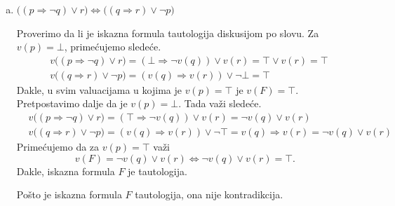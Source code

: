 \begin{enumerate}[(a)]
\item  $\big((p\Rightarrow\neg q)\vee r\big)\Leftrightarrow\big((q\Rightarrow r)\vee\neg p\big)$

Proverimo da li je iskazna formula tautologija diskusijom po slovu. Za $v(p)=\bot$, prime\' cujemo slede\' ce.
\begin{align*}
&v\big((p\Rightarrow\neg q)\vee r\big)=(\bot\Rightarrow \neg v(q))\vee v(r)=\top\vee v(r)=\top\\
&v\big((q\Rightarrow r)\vee\neg p\big)=(v(q)\Rightarrow v(r))\vee\neg\bot=\top
\end{align*}
Dakle, u svim valuacijama u kojima je $v(p)=\top$ je $v(F)=\top$. Pretpostavimo dalje da je $v(p)=\bot$. Tada va\v zi slede\' ce.
\begin{align*}
&v\big((p\Rightarrow\neg q)\vee r\big)=(\top\Rightarrow \neg v(q))\vee v(r)=\neg v(q)\vee v(r)\\
&v\big((q\Rightarrow r)\vee\neg p\big)=(v(q)\Rightarrow v(r))\vee\neg\top=v(q)\Rightarrow v(r)= \neg v(q)\vee v(r)
\end{align*}
Prime\' cujemo da za $v(p)=\top$ va\v zi 
\[v(F)=\neg v(q)\vee v(r)\Leftrightarrow \neg v(q)\vee v(r)=\top.\]
Dakle, iskazna formula $F$ je tautologija.

Po\v sto je iskazna formula $F$ tautologija, ona nije kontradikcija.
%
\end{enumerate}



